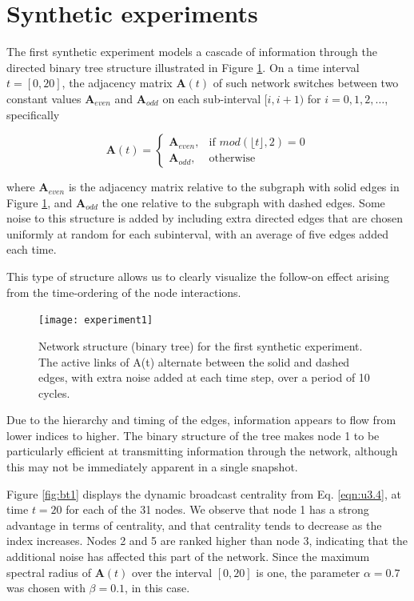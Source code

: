 \section{Synthetic experiments}
\label{sec:synexp}
The first synthetic experiment models a cascade of information through the directed binary
tree structure illustrated in Figure \ref{fig:exp1}. On a time interval $t = [0, 20]$, the adjacency
matrix $\mathbf{A}(t)$ of such network switches between two constant values $\mathbf{A}_{even}$ and $\mathbf{A}_{odd}$ on each sub-interval $[i, i + 1)$ for $i=0,1,2,\dots$, specifically

\begin{equation*}
\mathbf{A}(t)=
    \begin{cases}
        \mathbf{A}_{even}, & \text{if } mod(\lfloor t \rfloor, 2) = 0\\
        \mathbf{A}_{odd}, & \text{otherwise} 
    \end{cases}
\end{equation*}

where $\mathbf{A}_{even}$ is the adjacency matrix relative to the subgraph with solid edges in Figure \ref{fig:exp1}, and $\mathbf{A}_{odd}$ the one relative to the subgraph with dashed edges. Some noise to this structure is added by including extra directed edges that are chosen uniformly at random for each subinterval, with an average of five edges added each time. 

This type of structure allows us to clearly visualize the follow-on effect arising from the time-ordering of the node interactions.

\begin{figure}[h]\centering
    \texttt{[image: experiment1]}
    \caption{Network structure (binary tree) for the first synthetic experiment. The active links of A(t) alternate between the solid and dashed edges, with extra noise added at each time step, over a period of 10 cycles.}
    \label{fig:exp1}
    \bigskip
\end{figure}

Due to the hierarchy and timing of the edges, information appears to flow from lower indices to higher. The binary structure of the tree makes node 1 to be particularly efficient at transmitting information through the network, although this may not be immediately apparent in a single snapshot.

Figure \ref{fig:bt1} displays the dynamic broadcast centrality from Eq. \ref{eqn:u3.4}, at time $t=20$ for each of the 31 nodes. We observe that node 1 has a strong advantage in terms of centrality, and that centrality tends to decrease as the index increases. Nodes 2 and 5 are ranked higher than node 3, indicating that the additional noise has affected this part of the network. Since the maximum spectral radius of $\mathbf{A}(t)$ over the interval $[0, 20]$ is one, the parameter $\alpha=0.7$ was chosen with $\beta=0.1$, in this case.

